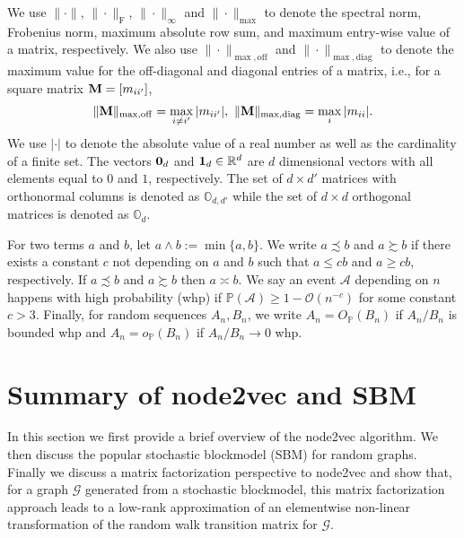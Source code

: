 \documentclass[10pt,journal,compsoc]{IEEEtran}
\newcommand*{\p}{\mathbb{P}}
\newcommand{\RR}{\mathbb{R}}
\newcommand{\ee}{\end{aligned} \end{equation}}
\newcommand{\bee}{\begin{equation}\begin{aligned}}
\newcommand{\M}[1]{{{\mathbf{\MakeUppercase{#1}}}}}
\newcommand{\F}{\mathrm{F}}
\numberwithin{equation}{section}
\begin{document}
We use $\|\cdot\|$, $\|\cdot \|_\F$, $\|\cdot\|_{\infty}$ and $\|\cdot\|_{\mathrm{max}}$ to denote the
spectral norm, Frobenius norm, maximum absolute row sum, and maximum entry-wise value of a matrix, respectively. 
We also use $\|\cdot\|_{\max,\mathrm{off}}$ and
$\|\cdot\|_{\max,\mathrm{diag}}$ to denote the maximum value for the
off-diagonal and diagonal entries of a matrix, i.e., for a square matrix $\M M =[m_{ii'}]$,
\bee
\|\M M\|_{\max,\mathrm{off}} = \max_{i\neq i'}
|m_{ii'}|, \,\, \|\M M\|_{\max,\mathrm{diag}} = \max_{i} |m_{ii}|.
\ee
 We use $|\cdot|$ to denote the absolute value of a real number as
 well as the cardinality of a finite set. The vectors $\M 0_{d}$ and
 $\M 1_{d} \in \RR^{d}$ are $d$ dimensional vectors with all elements
 equal to $0$ and $1$, respectively. The set of $d \times d'$
 matrices with orthonormal columns is denoted as
 $\mathbb{O}_{d,d'}$ while the set of $d \times d$ orthogonal
 matrices is denoted as $\mathbb{O}_{d}$. 

 For two terms $a$ and $b$, let $a\wedge b :=
 \min\{a,b\}$. We write $a \precsim b$ and $a \succsim b$ if there
 exists a constant $c$ not depending on $a$ and $b$ such that $a \leq
 c b$ and $a \geq c b$, respectively. If $a \precsim b$ and $a \succsim
 b$ then $a \asymp b$. We say an event $\mathcal{A}$ depending on $n$ happens with high probability (whp) if $\p(\mathcal{A}) \geq 1 - \mathcal{O}(n^{-c})$ for some constant $c > 3$. Finally, for random sequences $A_n, B_n$,
 we write $A_n = O_{\mathbb{P}}(B_n)$ if $A_n/B_n$ is bounded whp and
 $A_n = o_{\mathbb{P}}(B_n)$ if $A_n/B_n \rightarrow 0$ whp.
 
\section{Summary of node2vec and SBM}\label{sec:2}
In this section we first provide a brief overview of the node2vec
algorithm. We then discuss the popular stochastic blockmodel (SBM) for
random graphs. Finally we discuss a matrix factorization perspective
to node2vec and show that, for a graph $\mathcal{G}$ generated from
a stochastic blockmodel, this
matrix factorization approach leads to a low-rank approximation of an elementwise non-linear transformation of the random walk transition matrix for $\mathcal{G}$. 
\end{document}
